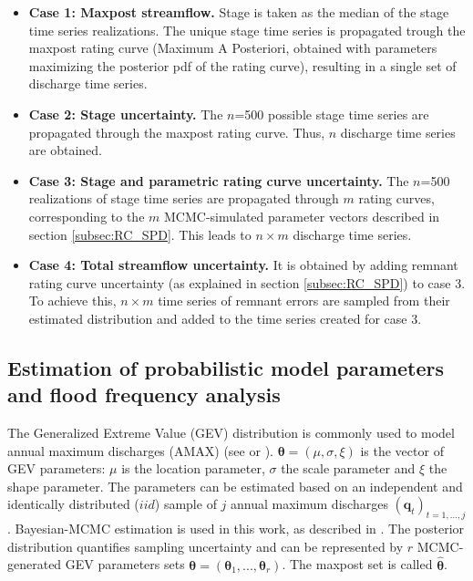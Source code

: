 \documentclass[11pt]{article}
\begin{document}
   \begin{itemize}
       \item \textbf{Case 1: Maxpost streamflow.} Stage is taken as the median of the stage time series realizations. The unique stage time series is propagated trough the maxpost rating curve (Maximum A Posteriori, obtained with parameters maximizing the posterior pdf of the rating curve), resulting in a single set of discharge time series. 
       
       \item \textbf{Case 2: Stage uncertainty.} The $n$=500 possible stage time series are propagated through the maxpost rating curve. Thus, $n$ discharge time series are obtained.
       
       \item \textbf{Case 3: Stage and parametric rating curve uncertainty.} The $n$=500 realizations of stage time series are propagated through $m$ rating curves, corresponding to the $m$ MCMC-simulated parameter vectors described in section \ref{subsec:RC_SPD}. This leads to $n \times m$ discharge time series. 
       
       \item \textbf{Case 4: Total streamflow uncertainty.} It is obtained by adding remnant rating curve uncertainty (as explained in section \ref{subsec:RC_SPD}) to case 3. To achieve this, $n \times m$ time series of remnant errors are sampled from their estimated distribution and added to the time series created for case 3. 
   \end{itemize}
   
    \subsection{Estimation of probabilistic model parameters and flood frequency analysis}
    \label{subsec:FFA}
    
    The Generalized Extreme Value (GEV) distribution is commonly used to model annual maximum discharges (AMAX) (see \citet{hamed_flood_2019} or \citet{jain_design_2019}). $\boldsymbol{\theta} = (\mu,\sigma,\xi)$ is the vector of GEV parameters: $\mu$ is the location parameter, $\sigma$ the scale parameter and $\xi$ the shape parameter. The parameters can be estimated based on an independent and identically distributed ($iid$) sample of $j$ annual maximum discharges $(\mathbf{q}_t)_{t=1,...,j}$. Bayesian-MCMC estimation is used in this work, as described in \citet{coles_classical_2001}. The posterior distribution quantifies sampling uncertainty and can be represented by $r$ MCMC-generated GEV parameters sets $\boldsymbol{\theta} = (\boldsymbol{\theta}_1,...,\boldsymbol{\theta}_r)$. The maxpost set is called $\boldsymbol{\hat{\theta}}$.
    
\end{document}
